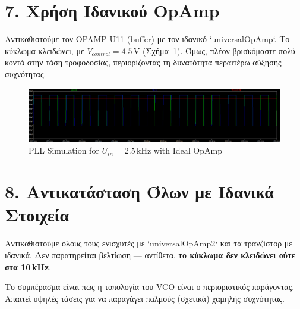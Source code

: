 \documentclass[11pt,letterpaper]{article}
\begin{document}
\section*{7. Χρήση Ιδανικού OpAmp}
Αντικαθιστούμε τον OPAMP U11 (buffer) με τον ιδανικό `universalOpAmp`. Το κύκλωμα κλειδώνει, με \( V_{control} = 4.5\,\text{V} \) (Σχήμα~\ref{fig:pll_simulation_2.5khz_ideal_opamp}). Όμως, πλέον βρισκόμαστε πολύ κοντά στην τάση τροφοδοσίας, περιορίζοντας τη δυνατότητα περαιτέρω αύξησης συχνότητας.

\begin{figure}[H]
    \centering
    \includegraphics[width=\textwidth]{figures/sim6.png}
    \caption{PLL Simulation for \( U_{in} = 2.5\,\text{kHz} \) with Ideal OpAmp}
    \label{fig:pll_simulation_2.5khz_ideal_opamp}
\end{figure}

\section*{8. Αντικατάσταση Όλων με Ιδανικά Στοιχεία}
Αντικαθιστούμε όλους τους ενισχυτές με `universalOpAmp2` και τα τρανζίστορ με ιδανικά. Δεν παρατηρείται βελτίωση — αντίθετα, \textbf{το κύκλωμα δεν κλειδώνει ούτε στα 10 kHz}.

Το συμπέρασμα είναι πως η τοπολογία του VCO είναι ο περιοριστικός παράγοντας. Απαιτεί υψηλές τάσεις για να παραγάγει παλμούς (σχετικά) χαμηλής συχνότητας.
\end{document}
